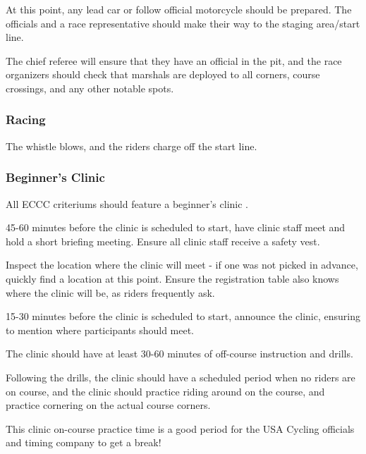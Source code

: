 \documentclass[
  letterpaper, %
  fontsize=10pt, %
  twoside=true,
  chapterentrydots=true, %
  numbers=noenddot,
  fontmethod=tex,
]{kaobook}
\begin{document}
At this point, any lead car or follow official motorcycle should be prepared.
The officials and a race representative should make their way to the staging area/start line.

The chief referee will ensure that they have an official in the pit, and the race organizers should check that marshals are deployed to all corners, course crossings, and any other notable spots.

\subsubsection{Racing}

The whistle blows, and the riders charge off the start line.


\subsubsection{Beginner's Clinic}

All ECCC criteriums should feature a
beginner's clinic%
%
.


45-60 minutes before the clinic is scheduled to start,
have clinic staff meet and hold a short briefing meeting.
Ensure all clinic staff receive a safety vest.

Inspect the location where the clinic will meet - if one was not picked in advance, quickly find a location at this point.
Ensure the registration table also knows where the clinic will be, as riders frequently ask.

15-30 minutes before the clinic is scheduled to start,
announce the clinic, ensuring to mention where participants should meet.

The clinic should have at least 30-60 minutes of off-course instruction and drills.

Following the drills, the clinic should have a scheduled period when no riders are on course, and the clinic should practice riding around on the course,
and practice cornering on the actual course corners.

This clinic on-course practice time is a good period for the USA Cycling officials and timing company to get a break!
\end{document}
